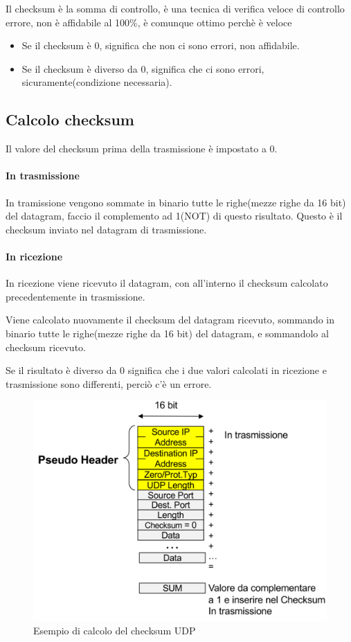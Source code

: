 Il checksum è la somma di controllo, è una tecnica di verifica veloce di controllo errore, non è affidabile al 100\%, è comunque ottimo perchè è veloce  
\begin{itemize}
    \item Se il checksum è 0, significa che non ci sono errori, non affidabile.
    \item Se il checksum è diverso da 0, significa che ci sono errori, sicuramente(condizione necessaria).
\end{itemize}
\subsection{Calcolo checksum}
Il valore del checksum prima della trasmissione è impostato a 0.
 \paragraph{In trasmissione}
In tramissione vengono sommate in binario tutte le righe(mezze righe da 16 bit) del datagram, faccio il complemento ad 1(NOT) di questo risultato. Questo è il checksum inviato nel datagram di trasmissione.
\paragraph{In ricezione}
In ricezione viene ricevuto il datagram, con all'interno il checksum calcolato precedentemente in trasmissione. 

Viene calcolato nuovamente il checksum del datagram ricevuto, sommando in binario tutte le righe(mezze righe da 16 bit) del datagram, e sommandolo al checksum ricevuto. 

Se il risultato è diverso da 0 significa che i due valori calcolati in ricezione e trasmissione sono differenti, perciò c'è un errore.


\begin{figure}[h!]
    \centering
    \includegraphics[width=1\textwidth]{images/checksum_udp.png}
    \caption{Esempio di calcolo del checksum UDP}
    \label{fig:checksumudp}
\end{figure}

